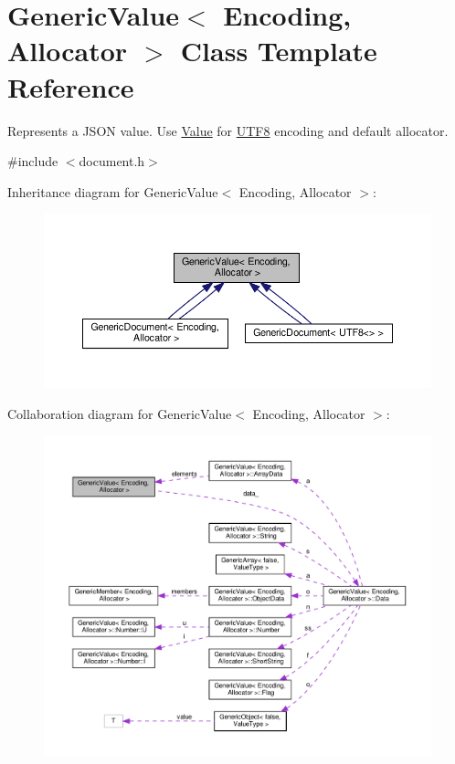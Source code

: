 \hypertarget{classGenericValue}{}\section{Generic\+Value$<$ Encoding, Allocator $>$ Class Template Reference}
\label{classGenericValue}


Represents a J\+S\+ON value. Use \hyperlink{classValue}{Value} for \hyperlink{structUTF8}{U\+T\+F8} encoding and default allocator.  




{\ttfamily \#include $<$document.\+h$>$}



Inheritance diagram for Generic\+Value$<$ Encoding, Allocator $>$\+:
\nopagebreak
\begin{figure}[H]
\begin{center}
\leavevmode
\includegraphics[width=350pt]{classGenericValue__inherit__graph}
\end{center}
\end{figure}


Collaboration diagram for Generic\+Value$<$ Encoding, Allocator $>$\+:
\nopagebreak
\begin{figure}[H]
\begin{center}
\leavevmode
\includegraphics[width=350pt]{classGenericValue__coll__graph}
\end{center}
\end{figure}
